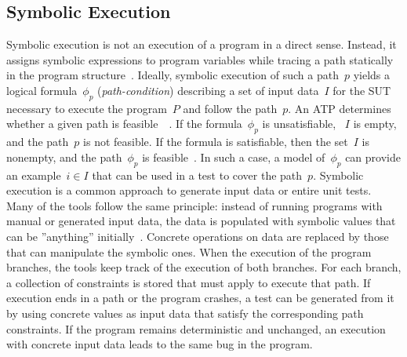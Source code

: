 \documentclass{article}
\begin{document}
\subsection{Symbolic Execution}
Symbolic execution is not an execution of a program in a direct sense. Instead, it assigns symbolic expressions to program variables while tracing a path statically in the program structure~\cite{McMinn_2004}. Ideally, symbolic execution of such a path~$p$ yields a logical formula~$\phi_{p}$ (\textit{path-condition}) describing a set of input data~$I$ for the \ac{SUT} necessary to execute the program~$P$ and follow the path~$p$. An \ac{ATP} determines whether a given path is feasible~~\cite{Clarke1976,King1976}. If the formula~$\phi_{p}$ is unsatisfiable, ~$I$ is empty, and the path~$p$ is not feasible. If the formula is satisfiable, then the set~$I$ is nonempty, and the path~$\phi_{p}$ is feasible~\cite{Ball2015}. In such a case, a model of~$\phi_{p}$ can provide an example~$i \in I$ that can be used in a test to cover the path~$p$. Symbolic execution is a common approach to generate input data or entire unit tests. Many of the tools follow the same principle: instead of running programs with manual or generated input data, the data is populated with symbolic values that can be ''anything'' initially~\cite{cadar2008klee}. Concrete operations on data are replaced by those that can manipulate the symbolic ones. When the execution of the program branches, the tools keep track of the execution of both branches. For each branch, a collection of constraints is stored that must apply to execute that path. If execution ends in a path or the program crashes, a test can be generated from it by using concrete values as input data that satisfy the corresponding path constraints. If the program remains deterministic and unchanged, an execution with concrete input data leads to the same bug in the program. 
\end{document}
